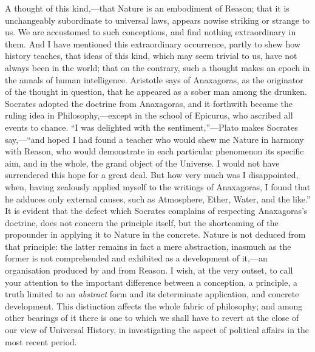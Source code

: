A thought of this kind,---that Nature is an embodiment of Reason; that
it is unchangeably subordinate to universal laws, appears nowise
striking or strange to us. We are accustomed to such conceptions, and
find nothing extraordinary in them. And I have mentioned this
extraordinary occurrence, partly to shew how history teaches, that
ideas of this kind, which may seem trivial to us, have not always been
in the world; that on the contrary, such a thought makes an epoch in
the annals of human intelligence. Aristotle says of Anaxagoras, as the
originator of the thought in question, that he appeared as a sober man
among the drunken. Socrates adopted the doctrine from Anaxagoras, and
it forthwith became the ruling idea in Philosophy,---except in the
school of Epicurus, who ascribed all events to chance. ``I was
delighted with the sentiment,''---Plato makes Socrates say,---``and
hoped I had found a teacher who would shew me Nature in harmony with
Reason, who would demonstrate in each particular phenomenon its
specific aim, and in the whole,  the grand object of the
Universe. I would not have surrendered this hope for a great deal. But
how very much was I disappointed, when, having zealously applied
myself to the writings of Anaxagoras, I found that he adduces only
external causes, such as Atmosphere, Ether, Water, and the like.'' It
is evident that the defect which Socrates complains of respecting
Anaxagoras's doctrine, does not concern the principle itself, but the
shortcoming of the propounder in applying it to Nature in the
concrete. Nature is not deduced from that principle: the latter
remains in fact a mere abstraction, inasmuch as the former is not
comprehended and exhibited as a development of it,---an organisation
produced by and from Reason. I wish, at the very outset, to call your
attention to the important difference between a conception, a
principle, a truth limited to an \textit{abstract} form and its
determinate application, and concrete development. This distinction
affects the whole fabric of philosophy; and among other bearings of it
there is one to which we shall have to revert at the close of our view
of Universal History, in investigating the aspect of political affairs
in the most recent period.


